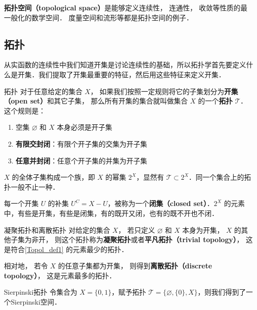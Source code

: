 

\textbf{拓扑空间（topological space）}是能够定义连续性， 连通性， 收敛等性质的最一般化的数学空间． 度量空间和流形等都是拓扑空间的例子．

\subsection{拓扑}

从实函数的连续性中我们知道开集是讨论连续性的基础，所以拓扑学首先要定义什么是开集．我们提取了开集最重要的特征，然后用这些特征来定义开集．

\begin{definition}{拓扑}\label{Topol_def1}
对于任意给定的集合 $X$， 如果我们按照一定规则将它的子集划分为\textbf{开集（open set）}和其它子集， 那么所有开集的集合就叫做集合 $X$ 的一个\textbf{拓扑} $\mathcal{T}$． 这个规则是：
\begin{enumerate}
\item 空集 $\varnothing$ 和 $X$ 本身必须是开子集
\item \textbf{有限交封闭}：有限个开子集的交集为开子集
\item \textbf{任意并封闭}：任意个开子集的并集为开子集
\end{enumerate}
\end{definition}

$X$ 的全体子集构成一个族，即 $X$ 的幂集 $2^X$，显然有 $\mathcal{T}\subset2^X$．同一个集合上的拓扑一般不止一种．

每一个开集 $U$ 的补集 $U^C=X-U$，被称为一个\textbf{闭集（closed set）}．$2^X$ 的元素中，有些是开集，有些是闭集，有的既开又闭，也有的既不开也不闭．

\begin{example}{凝聚拓扑和离散拓扑}
对给定的集合 $X$， 若只定义 $\varnothing$ 和 $X$ 本身为开集， $X$ 的其他子集为非开， 则这个拓扑称为\textbf{凝聚拓扑}或者\textbf{平凡拓扑（trivial topology）}， 这是符合\autoref{Topol_def1} 的元素最少的拓扑．

相对地， 若令 $X$ 的任意子集都为开集， 则得到\textbf{离散拓扑（discrete topology）}， 这是元素最多的拓扑．
\end{example}

\begin{example}{Sierpinski拓扑}
令集合为 $X=\{0, 1\}$，赋予拓扑 $\mathcal{T}=\{\varnothing, \{0\}, X\}$，则我们得到了一个Sierpinski空间．
\end{example}

